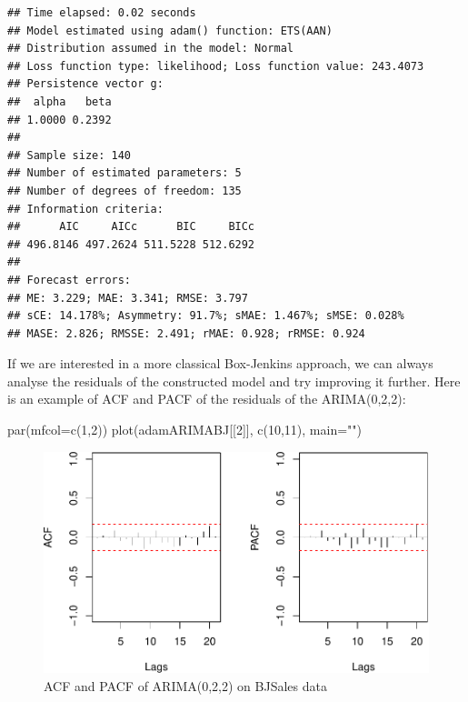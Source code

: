 \documentclass[
]{book}
\newenvironment{Shaded}{\begin{snugshade}}{\end{snugshade}}
\newcommand{\AttributeTok}[1]{\textcolor[rgb]{0.77,0.63,0.00}{#1}}
\newcommand{\DecValTok}[1]{\textcolor[rgb]{0.00,0.00,0.81}{#1}}
\newcommand{\FunctionTok}[1]{\textcolor[rgb]{0.00,0.00,0.00}{#1}}
\newcommand{\NormalTok}[1]{#1}
\newcommand{\StringTok}[1]{\textcolor[rgb]{0.31,0.60,0.02}{#1}}
\theoremstyle{definition}
\theoremstyle{definition}
\theoremstyle{definition}
\theoremstyle{definition}
\theoremstyle{remark}
\begin{document}
\begin{verbatim}
## Time elapsed: 0.02 seconds
## Model estimated using adam() function: ETS(AAN)
## Distribution assumed in the model: Normal
## Loss function type: likelihood; Loss function value: 243.4073
## Persistence vector g:
##  alpha   beta 
## 1.0000 0.2392 
## 
## Sample size: 140
## Number of estimated parameters: 5
## Number of degrees of freedom: 135
## Information criteria:
##      AIC     AICc      BIC     BICc 
## 496.8146 497.2624 511.5228 512.6292 
## 
## Forecast errors:
## ME: 3.229; MAE: 3.341; RMSE: 3.797
## sCE: 14.178%; Asymmetry: 91.7%; sMAE: 1.467%; sMSE: 0.028%
## MASE: 2.826; RMSSE: 2.491; rMAE: 0.928; rRMSE: 0.924
\end{verbatim}

If we are interested in a more classical Box-Jenkins approach, we can always analyse the residuals of the constructed model and try improving it further. Here is an example of ACF and PACF of the residuals of the ARIMA(0,2,2):

\begin{Shaded}
\begin{Highlighting}[]
\FunctionTok{par}\NormalTok{(}\AttributeTok{mfcol=}\FunctionTok{c}\NormalTok{(}\DecValTok{1}\NormalTok{,}\DecValTok{2}\NormalTok{))}
\FunctionTok{plot}\NormalTok{(adamARIMABJ[[}\DecValTok{2}\NormalTok{]], }\FunctionTok{c}\NormalTok{(}\DecValTok{10}\NormalTok{,}\DecValTok{11}\NormalTok{), }\AttributeTok{main=}\StringTok{""}\NormalTok{)}
\end{Highlighting}
\end{Shaded}

\begin{figure}
\centering
\includegraphics{Svetunkov--2022----ADAM_files/figure-latex/adamARIMAPlotBJSalesACFPACF-1.pdf}
\caption{\label{fig:adamARIMAPlotBJSalesACFPACF}ACF and PACF of ARIMA(0,2,2) on BJSales data}
\end{figure}
\end{document}
